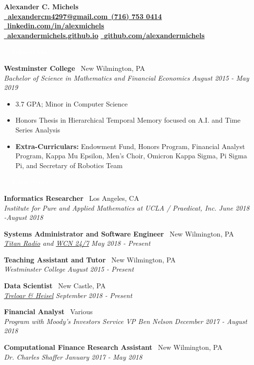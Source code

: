 \documentclass[letterpaper,11pt]{article}
\newcommand{\resitem}[1]{\item[--] #1}
\newcommand{\resheading}[1]{{\vspace{2pt}\large \colorbox{electricpurple}{\begin{minipage}{\textwidth}{\textbf{#1 \vphantom{p\^{E}}}}\end{minipage}}}\vspace{3pt}}
\newcommand{\Position}[4]{
	\textbf{#1} \hfill \faMapPin \ #2 \\
	\textit{#3} \hfill \textit{#4} \\
	\vspace{1pt}
}
\newenvironment{titemize}{
	\vspace{-12pt}
	\begin{itemize}
		\setlength{\itemsep}{0pt}
		\setlength{\parskip}{0pt}
		\setlength{\topsep}{0pt}
}{\end{itemize}\vspace{-12pt}}
\begin{document}
	
	

		\textbf{\LARGE Alexander C. Michels} \\
	 \href{mailto:alexandercm4297@gmail.com}{\textbf{\faEnvelope \ alexandercm4297@gmail.com}}\hfill\href{tel:17167530414}{\faPhone \ \textbf{(716) 753 0414}} \hfill \href{https://www.linkedin.com/in/alexmichels/}{\faLinkedin \ \textbf{linkedin.com/in/alexmichels}} \\
	\href{http://alexandermichels.github.io}{\faGlobeAmericas \ \textbf{alexandermichels.github.io}} \hfill \href{https://github.com/alexandermichels}{\faGithub \ \textbf{github.com/alexandermichels}} \\
	
	\resheading{\textcolor{white}{\ \faGraduationCap \ Education}}

		\Position{Westminster College}{New Wilmington, PA}{Bachelor of Science in Mathematics and Financial Economics}{August 2015 - May 2019}
		\begin{titemize}
			\resitem{3.7 GPA; Minor in Computer Science}
			\resitem{Honors Thesis in Hierarchical Temporal Memory focused on A.I. and Time Series Analysis}
			\resitem{\textbf{Extra-Curriculars: }Endowment Fund, Honors Program, Financial Analyst Program, Kappa Mu Epsilon, Men’s Choir, Omicron Kappa Sigma, Pi Sigma Pi, and Secretary of Robotics Team}
		\end{titemize}
	
	\resheading{\textcolor{white}{\ \faBriefcase  \  Experience}}
	
		\Position{Informatics Researcher}{Los Angeles, CA}{Institute for Pure and Applied Mathematics at UCLA / Praedicat, Inc.}{June 2018 -August 2018}

		\Position{Systems Administrator and Software Engineer}{New Wilmington, PA}{\href{http://titanradio.net/}{Titan Radio} and \href{https://www.wcn247.com/}{WCN 24/7}}{May 2018 - Present}
		
		\Position{Teaching Assistant and Tutor}{New Wilmington, PA}{Westminster College}{August 2015 - Present}
		
		\Position{Data Scientist}{New Castle, PA}{\href{http://treloaronline.com/}{Treloar \& Heisel}}{September 2018 - Present}
		
		\Position{Financial Analyst}{Various}{Program with Moody’s Investors Service VP Ben Nelson}{December 2017 - August 2018}

		\Position{Computational Finance Research Assistant}{New Wilmington, PA}{Dr. Charles Shaffer}{January 2017 - May 2018}
\end{document}
